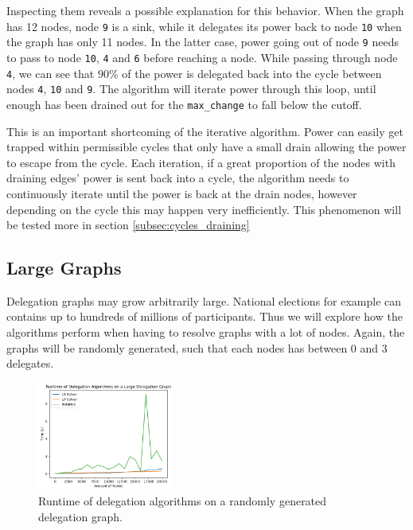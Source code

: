 Inspecting them reveals a possible explanation for this behavior. When the graph has 12 nodes, node \texttt{9} is a sink, while it delegates its power back to node \texttt{10} when the graph has only 11 nodes. In the latter case, power going out of node \texttt{9} needs to pass to node \texttt{10}, \texttt{4} and \texttt{6} before reaching a node. While passing through node \texttt{4}, we can see that 90\% of the power is delegated back into the cycle between nodes \texttt{4}, \texttt{10} and \texttt{9}. The algorithm will iterate power through this loop, until enough has been drained out for the \texttt{max\_change} to fall below the cutoff. 

This is an important shortcoming of the iterative algorithm. Power can easily get trapped within permissible cycles that only have a small drain allowing the power to escape from the cycle. Each iteration, if a great proportion of the nodes with draining edges' power is sent back into a cycle, the algorithm needs to continuously iterate until the power is back at the drain nodes, however depending on the cycle this may happen very inefficiently. This phenomenon will be tested more in section \ref{subsec:cycles_draining}

\subsection{Large Graphs}

Delegation graphs may grow arbitrarily large. National elections for example can contains up to hundreds of millions of participants. Thus we will explore how the algorithms perform when having to resolve graphs with a lot of nodes. Again, the graphs will be randomly generated, such that each nodes has between 0 and 3 delegates. 

\begin{figure}[h]
    \centering
    \includegraphics[width=0.4\textwidth]{0-20000_random}
    \caption{Runtime of delegation algorithms on a randomly generated delegation graph.}
    \label{fig:random-large}
\end{figure}

